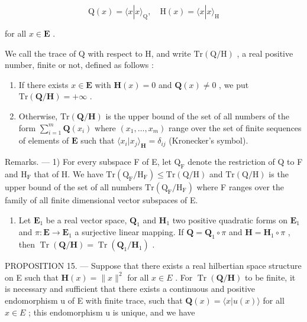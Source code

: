 \[
\mathrm{Q} (x) = \langle x | x \rangle_ {\mathrm{Q}}, \quad \mathrm{H} (x) = \langle x | x \rangle_ {\mathrm{H}}
\]

for all \(x \in \mathbf{E}\) .

We call the trace of Q with respect to H, and write \(\mathrm{Tr}(\mathrm{Q}/\mathrm{H})\) , a real positive number, finite or not, defined as follows :

\begin{enumerate}
\def\labelenumi{\alph{enumi})}
\tightlist
\item
  If there exists \(x \in \mathbf{E}\) with \(\mathbf{H}(x) = 0\) and \(\mathbf{Q}(x) \neq 0\) , we put \(\mathrm{Tr}(\mathbf{Q} / \mathbf{H}) = +\infty\) .
\item
  Otherwise, \(\mathrm{Tr}(\mathbf{Q} / \mathbf{H})\) is the upper bound of the set of all numbers of the form \(\sum_{i=1}^{m} \mathbf{Q}(x_i)\) where \((x_1, \ldots, x_m)\) range over the set of finite sequences of elements of \(\mathbf{E}\) such that \(\langle x_i | x_j \rangle_{\mathbf{H}} = \delta_{ij}\) (Kronecker's symbol).
\end{enumerate}

Remarks. --- 1) For every subspace F of E, let \(\mathrm{Q}_{\mathrm{F}}\) denote the restriction of Q to F and \(\mathrm{H}_{\mathrm{F}}\) that of H. We have \(\mathrm{Tr}(\mathrm{Q}_{\mathrm{F}} / \mathrm{H}_{\mathrm{F}}) \leqslant \mathrm{Tr}(\mathrm{Q} / \mathrm{H})\) and \(\mathrm{Tr}(\mathrm{Q} / \mathrm{H})\) is the upper bound of the set of all numbers \(\mathrm{Tr}(\mathrm{Q}_{\mathrm{F}} / \mathrm{H}_{\mathrm{F}})\) where F ranges over the family of all finite dimensional vector subspaces of E.

\begin{enumerate}
\def\labelenumi{\arabic{enumi})}
\setcounter{enumi}{1}
\tightlist
\item
  Let \(\mathbf{E}_1\) be a real vector space, \(\mathbf{Q}_1\) and \(\mathbf{H}_1\) two positive quadratic forms on \(\mathbf{E}_1\) and \(\pi: \mathbf{E} \to \mathbf{E}_1\) a surjective linear mapping. If \(\mathbf{Q} = \mathbf{Q}_1 \circ \pi\) and \(\mathbf{H} = \mathbf{H}_1 \circ \pi\) , then \(\operatorname{Tr}(\mathbf{Q}/\mathbf{H}) = \operatorname{Tr}(\mathbf{Q}_1/\mathbf{H}_1)\) .
\end{enumerate}

PROPOSITION 15. --- Suppose that there exists a real hilbertian space structure on E such that \(\mathbf{H}(x) = \|x\|^2\) for all \(x \in E\) . For \(\operatorname{Tr}(\mathbf{Q}/\mathbf{H})\) to be finite, it is necessary and sufficient that there exists a continuous and positive endomorphism u of E with finite trace, such that \(\mathbf{Q}(x) = \langle x|u(x) \rangle\) for all \(x \in E\) ; this endomorphism u is unique, and we have

